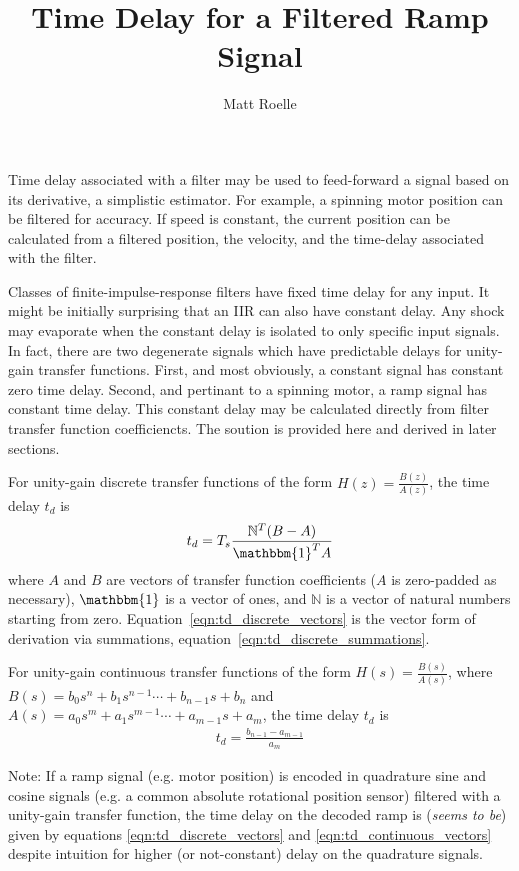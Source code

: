 \documentclass[10pt,letterpaper]{article}
\title{Time Delay for a Filtered Ramp Signal}
\author{Matt Roelle}
\begin{document}
\maketitle
Time delay associated with a filter may be used to feed-forward a signal based on its derivative, a simplistic estimator. For example, a spinning motor position can be filtered for accuracy. If speed is constant, the current position can be calculated from a filtered position, the velocity, and the time-delay associated with the filter.

Classes of finite-impulse-response filters have fixed time delay for any input. It might be initially surprising that an IIR can also have constant delay. Any shock may evaporate when the constant delay is isolated to only specific input signals. In fact, there are two degenerate signals which have predictable delays for unity-gain transfer functions. First, and most obviously, a constant signal has constant zero time delay. Second, and pertinant to a spinning motor, a ramp signal has constant time delay. This constant delay may be calculated directly from filter transfer function coefficiencts. The soution is provided here and derived in later sections.

For unity-gain discrete transfer functions of the form $H(z)=\frac{B(z)}{A(z)}$, the time delay $t_d$ is
\begin{eqnarray}
t_d = T_s\frac{\mathbb{N}^T(B-A)}{\mathbbm{1}^TA}
\label{eqn:td_discrete_vectors}
\end{eqnarray}
where $A$ and $B$ are vectors of transfer function coefficients ($A$ is zero-padded as necessary), $\mathbbm{1}$ is a vector of ones, and $\mathbb{N}$ is a vector of natural numbers starting from zero. Equation~\ref{eqn:td_discrete_vectors} is the vector form of derivation via summations, equation~\ref{eqn:td_discrete_summations}.

For unity-gain continuous transfer functions of the form $H(s)=\frac{B(s)}{A(s)}$, where $B(s) = b_0s^n + b_1s^{n-1}\cdots + b_{n-1}s + b_n$ and $A(s) = a_0s^m + a_1s^{m-1}\cdots + a_{m-1}s + a_m$, the time delay $t_d$ is
\begin{eqnarray}
t_d = \frac{b_{n-1} - a_{m-1}}{a_m}
\label{eqn:td_continuous_vectors}
\end{eqnarray}

Note: If a ramp signal (e.g. motor position) is encoded in quadrature sine and cosine signals (e.g. a common absolute rotational position sensor) filtered with a unity-gain transfer function, the time delay on the decoded ramp is (\textit{seems to be}) given by equations \ref{eqn:td_discrete_vectors} and \ref{eqn:td_continuous_vectors} despite intuition for higher (or not-constant) delay on the quadrature signals.
\end{document}
